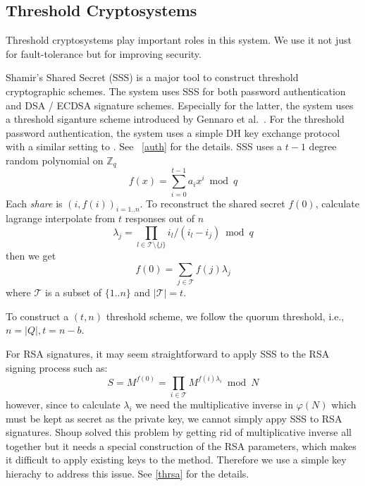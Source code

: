 \subsection{Threshold Cryptosystems}
Threshold cryptosystems play important roles in this system. We use it
not just for fault-tolerance but for improving security.

Shamir's Shared Secret (SSS) \cite{shamir} is a major tool to
construct threshold cryptographic schemes. The system uses SSS for
both password authentication and DSA / ECDSA signature
schemes. Especially for the latter, the system uses a threshold
siganture scheme introduced by Gennaro et al.\ \cite{Gennaro}. For the
threshold password authentication, the system uses a simple DH key
exchange protocol with a similar setting to \cite{ford}.
See ~\ref{auth} for the details.
SSS uses a $t-1$ degree random polynomial on $\mathbb{Z}_q$
\[
  f(x) = \sum_{i=0}^{t-1}a_ix^i \bmod q
\]
Each {\em share} is $(i, f(i))_{i = 1..n}$. To reconstruct the shared
secret $f(0)$, calculate lagrange interpolate from $t$ responses out
of $n$
\[
    \lambda_j = \prod_{l \in \mathcal{T} \setminus \{j\}}
    i_l / (i_l - i_j) \bmod q
\]
then we get
\[
  f(0) = \sum_{j \in \mathcal{T}} f(j)\lambda_j
\]
where $\mathcal{T}$ is a subset of $\{1..n\}$ and $|\mathcal{T}| =
t$.

To construct a $(t, n)$ threshold scheme, we follow the quorum
threshold, i.e., $n = |Q|, t = n-b$.

For RSA signatures, it may seem straightforward to apply SSS to the
RSA signing process such as:
\[ S = M^{f(0)} = \prod_{i \in \mathcal{T}} M^{f(i)\lambda_i} \bmod N \]
however, since to calculate $\lambda_i$ we need the multiplicative
inverse in $\varphi(N)$ which must be kept as secret as the private
key, we cannot simply appy SSS to RSA signatures. Shoup \cite{shoup}
solved this problem by getting rid of multiplicative inverse all
together but it needs a special construction of the RSA parameters,
which makes it difficult to apply existing keys to the
method. Therefore we use a simple key hierachy to address this
issue. See \ref{thrsa} for the details.

